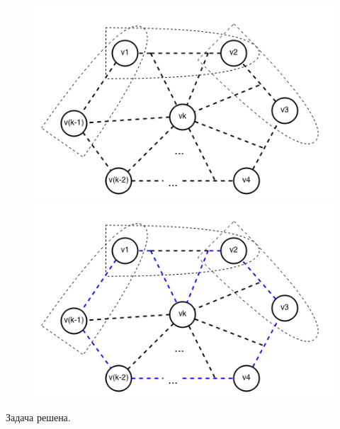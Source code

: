 \documentclass[russian]{article}
\begin{document}
\begin{figure}[H]
\begin{minipage}[t]{0.5\columnwidth}%
\begin{center}
\includegraphics[scale=0.45]{3_3}
\par\end{center}%
\end{minipage}\hfill{}%
\begin{minipage}[t]{0.5\columnwidth}%
\begin{center}
\includegraphics[scale=0.45]{3_4}
\par\end{center}%
\end{minipage}\linebreak{}
\end{figure}

Задача решена.
\end{document}
